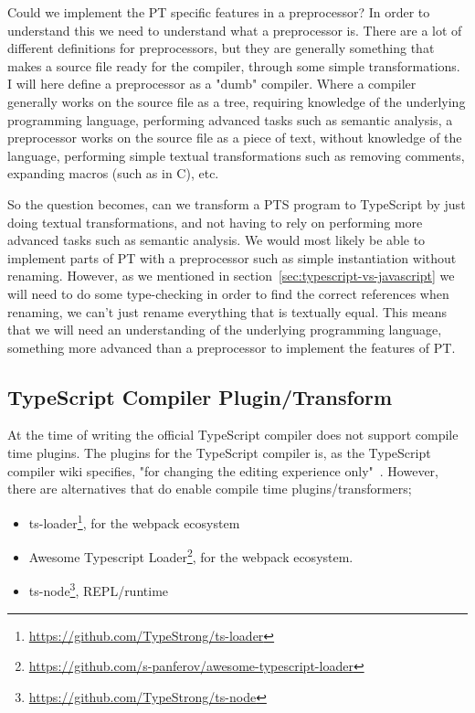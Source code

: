 Could we implement the PT specific features in a preprocessor?
In order to understand this we need to understand what a preprocessor is.
There are a lot of different definitions for preprocessors, but they are generally something that makes a source file ready for the compiler, through some simple transformations.
I will here define a preprocessor as a "dumb" compiler.
Where a compiler generally works on the source file as a tree, requiring knowledge of the underlying programming language, performing advanced tasks such as semantic analysis, a preprocessor works on the source file as a piece of text, without knowledge of the language, performing simple textual transformations such as removing comments, expanding macros (such as  in C), etc.

So the question becomes, can we transform a PTS program to TypeScript by just doing textual transformations, and not having to rely on performing more advanced tasks such as semantic analysis.
We would most likely be able to implement parts of PT with a preprocessor such as simple instantiation without renaming.
However, as we mentioned in section~\vref{sec:typescript-vs-javascript} we will need to do some type-checking in order to find the correct references when renaming, we can't just rename everything that is textually equal.
This means that we will need an understanding of the underlying programming language, something more advanced than a preprocessor to implement the features of PT\@.

\subsection{TypeScript Compiler Plugin/Transform}\label{subsec:typescript-compiler-plugin}

At the time of writing the official TypeScript compiler does not support compile time plugins.
The plugins for the TypeScript compiler is, as the TypeScript compiler wiki specifies, "for changing the editing experience only"~\cite{tscplugin}.
However, there are alternatives that do enable compile time plugins/transformers;

\begin{itemize}
    \item ts-loader\footnote{\url{https://github.com/TypeStrong/ts-loader}}, for the webpack ecosystem
    \item Awesome Typescript Loader\footnote{\url{https://github.com/s-panferov/awesome-typescript-loader}}, for the webpack ecosystem.
    \item ts-node\footnote{\url{https://github.com/TypeStrong/ts-node}}, REPL/runtime
\end{itemize}

